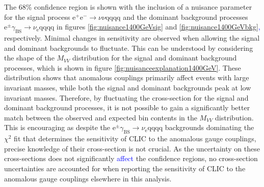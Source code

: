 The 68\% confidence region is shown with the inclusion of a nuisance parameter for the signal process $\text{e}^{+}\text{e}^{-} \rightarrow \nu{\nu}\text{qqqq}$ and the dominant background processes $\text{e}^{\pm}\gamma_{\text{BS}} \rightarrow \nu_{\text{e}}\text{qqqq}$ in figures \ref{fig:nuisance1400GeVsig} and \ref{fig:nuisance1400GeVbkg}\textcolor{blue}{,} respectively.  Minimal changes in sensitivity are observed when allowing the signal and dominant backgrounds to fluctuate.  This can be understood by considering the shape of the $M_{VV}$ distribution for the signal and dominant background processes, which is shown in figure \ref{fig:nuisanceexplanation1400GeV}.  These distribution shows that anomalous couplings primarily affect events with large invariant masses, while both the signal and dominant backgrounds peak at low invariant masses.  Therefore, by fluctuating the cross-section for the signal and dominant background processes, it is not possible to gain a significantly better match between the observed and expected bin contents in the $M_{VV}$ distribution.  This is encouraging as despite the $\text{e}^{\pm}\gamma_{\text{BS}} \rightarrow \nu_{\text{e}}\text{qqqq}$ backgrounds dominating the $\chi^{2}$ fit that determines the sensitivity of CLIC to the anomalous gauge couplings, precise knowledge of their cross-section is not crucial.  As the uncertainty on these cross-sections does not significantly \textcolor{blue}{affect} the confidence regions, no cross-section uncertainties are accounted for when reporting the sensitivity of CLIC to the anomalous gauge couplings elsewhere in this analysis.   

